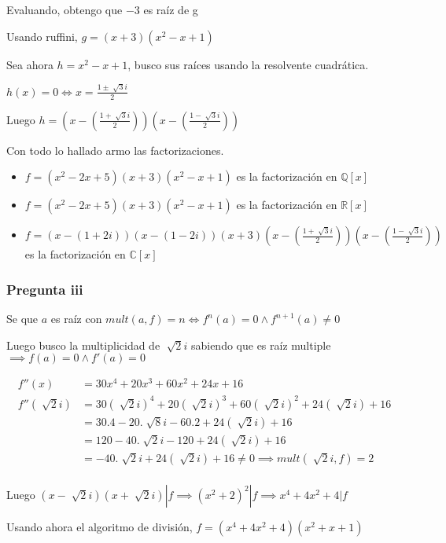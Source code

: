 Evaluando, obtengo que $-3$ es raíz de g

Usando ruffini, $ g = (x+3)(x^2-x+1) $

Sea ahora $ h = x^2-x+1 $, busco sus raíces usando la resolvente cuadrática.

$ h(x) = 0 \iff x = \frac{1 \pm \sqrt[]{3}i}{2} $

Luego $ h = (x-(\frac{1 + \sqrt[]{3}i}{2}))(x-(\frac{1 - \sqrt[]{3}i}{2})) $ 

Con todo lo hallado armo las factorizaciones.

\begin{itemize}
    \item $ f = (x^2-2x+5)(x+3)(x^2-x+1) $ es la factorización en $ \mathbb{Q}[x] $
    \item $ f = (x^2-2x+5)(x+3)(x^2-x+1) $ es la factorización en $ \mathbb{R}[x] $
    \item $ f = (x-(1+2i))(x-(1-2i))(x+3)(x-(\frac{1 + \sqrt[]{3}i}{2}))(x-(\frac{1 - \sqrt[]{3}i}{2})) $ es la factorización en $ \mathbb{C}[x] $
\end{itemize}

\subsubsection{Pregunta iii}

Se que $ a $ es raíz con $ mult(a, f) = n \iff f^n(a) = 0 \wedge f^{n+1}(a) \neq 0 $

Luego busco la multiplicidad de $ \sqrt[]{2}i $ sabiendo que es raíz multiple $ \implies f(a) = 0 \wedge f'(a) = 0 $

\begin{align*}
    f''(x) &= 30x^4 + 20x^3 + 60x^2 + 24x + 16 \\
    f''(\sqrt[]{2}i) &= 30(\sqrt[]{2}i)^4 + 20(\sqrt[]{2}i)^3 + 60(\sqrt[]{2}i)^2 + 24(\sqrt[]{2}i) + 16 \\
    &= 30.4 - 20.\sqrt[]{8}i - 60.2 + 24(\sqrt[]{2}i) + 16 \\
    &= 120 - 40.\sqrt[]{2}i - 120 + 24(\sqrt[]{2}i) + 16 \\
    &= - 40.\sqrt[]{2}i + 24(\sqrt[]{2}i) + 16 \neq 0 \implies mult(\sqrt[]{2}i, f) = 2 \\
\end{align*}

Luego $ (x-\sqrt[]{2}i)(x+\sqrt[]{2}i) | f \implies (x^2+2)^2 | f \implies x^4 + 4x^2 + 4 |f $

Usando ahora el algoritmo de división, $ f = (x^4 + 4x^2 + 4)(x^2+x+1) $


